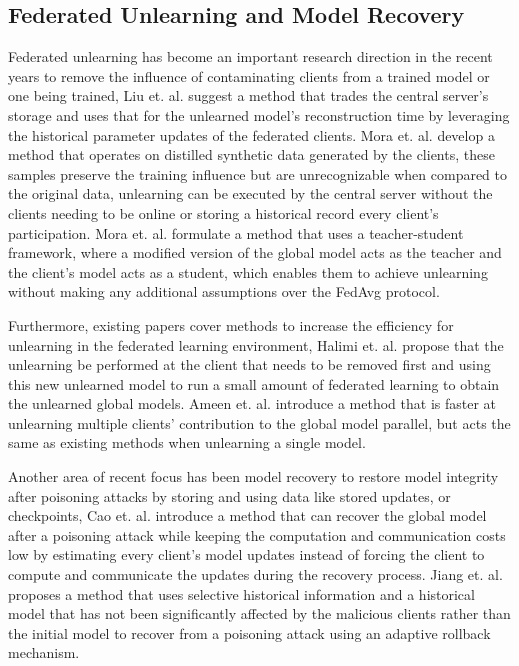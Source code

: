 \documentclass[10pt,journal,compsoc]{IEEEtran}
\begin{document}
\subsection{Federated Unlearning and Model Recovery}
Federated unlearning has become an important research direction in the recent years to remove the influence of contaminating clients from a trained model or one being trained, 
Liu et. al. \cite{Liu2021FedEraserEE} suggest a method that trades the central server's storage and uses that for the unlearned model's reconstruction time by leveraging the historical parameter updates of the federated clients.
Mora et. al. \cite{Mora2026FederatedUV} develop a method that operates on distilled synthetic data generated by the clients, these samples preserve the training influence but are unrecognizable when compared to the original data, unlearning can be executed by the central server without the clients needing to be online or storing a historical record every client's participation.
Mora et. al. \cite{Mora2024FedQUITOF} formulate a method that uses a teacher-student framework, where a modified version of the global model acts as the teacher and the client's model acts as a student, which enables them to achieve unlearning without making any additional assumptions over the FedAvg \cite{fedavg} protocol.

Furthermore, existing papers cover methods to increase the efficiency for unlearning in the federated learning environment, 
Halimi et. al. \cite{Halimi2022FederatedUH} propose that the unlearning be performed at the client that needs to be removed first and using this new unlearned model to run a small amount of federated learning to obtain the unlearned global models.
Ameen et. al. \cite{Ameen2025SpeedUF} introduce a method that is faster at unlearning multiple clients' contribution to the global model parallel, but acts the same as existing methods when unlearning a single model.

Another area of recent focus has been model recovery to restore model integrity after poisoning attacks by storing and using data like stored updates, or checkpoints, 
Cao et. al. \cite{Cao2022FedRecoverRF} introduce a method that can recover the global model after a poisoning attack while keeping the computation and communication costs low by estimating every client's model updates instead of forcing the client to compute and communicate the updates during the recovery process.
Jiang et. al. \cite{Jiang2024TowardEA} proposes a method that uses selective historical information and a historical model that has not been significantly affected by the malicious clients rather than the initial model to recover from a poisoning attack using an adaptive rollback mechanism.
\end{document}
